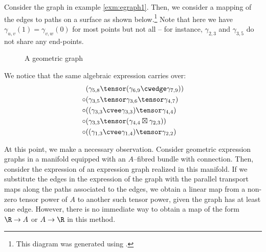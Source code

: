 \documentclass[./Thick_TQFTs_and_Quantum_Information.tex]{subfiles}
\begin{document}
\begin{exm}\label{exm:geomegraph}
Consider the graph in example \ref{exm:egraph1}. Then, we consider a mapping of
the edges to paths on a surface as shown below.\footnote{This diagram was
generated using \cite{Mathcha}.} Note that here we have
$\gamma_{u, v}(1) = \gamma_{v, w}(0)$ for most points but not all -- for
instance, $\gamma_{2, 3}$ and $\gamma_{3, 5}$ do not share any end-points.
\begin{figure}[H]
\begin{center}

\end{center}
\caption{A geometric graph}
\end{figure}
We notice that the same algebraic expression carries over:
\begin{align*}
        & (\gamma_{5, 8} \tensor (\gamma_{6, 9} \cwedge \gamma_{7, 9})) \\
  \circ & (\gamma_{3, 5} \tensor \gamma_{3, 6} \tensor \gamma_{4, 7}) \\
  \circ & ((\gamma_{3, 3} \cvee \gamma_{3, 3}) \tensor \gamma_{4, 4}) \\
  \circ & (\gamma_{3, 3} \tensor (\gamma_{4, 4} \boxtimes \gamma_{2, 3})) \\
  \circ & ((\gamma_{1, 3} \cvee \gamma_{1, 4}) \tensor \gamma_{2, 2})
\end{align*}
\end{exm}

At this point, we make a necessary observation. Consider geometric expression
graphs in a manifold equipped with an $A$--fibred bundle with connection. Then,
consider the expression of an expression graph realized in this manifold. If we
substitute the edges in the expression of the graph with the parallel transport
maps along the paths associated to the edges, we obtain a linear map from a
non-zero tensor power of $A$ to another such tensor power, given the graph has
at least one edge. However, there is no immediate way to obtain a map of the
form $\R \to A$ or $A \to \R$ in this method.
\end{document}
